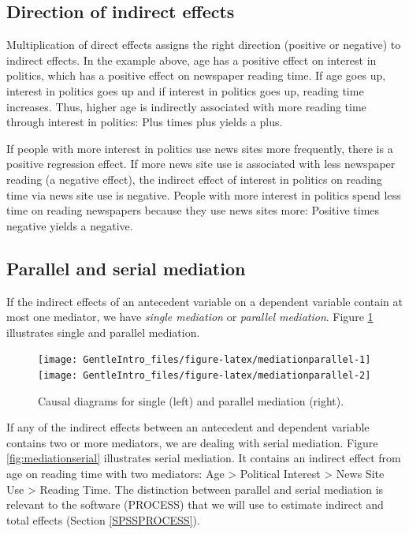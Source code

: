 \documentclass[a4paper]{book}
\theoremstyle{definition}
\theoremstyle{definition}
\theoremstyle{definition}
\theoremstyle{remark}
\begin{document}
\subsection{Direction of indirect
effects}\label{direction-of-indirect-effects}

Multiplication of direct effects assigns the right direction (positive
or negative) to indirect effects. In the example above, age has a
positive effect on interest in politics, which has a positive effect on
newspaper reading time. If age goes up, interest in politics goes up and
if interest in politics goes up, reading time increases. Thus, higher
age is indirectly associated with more reading time through interest in
politics: Plus times plus yields a plus.

If people with more interest in politics use news sites more frequently,
there is a positive regression effect. If more news site use is
associated with less newspaper reading (a negative effect), the indirect
effect of interest in politics on reading time via news site use is
negative. People with more interest in politics spend less time on
reading newspapers because they use news sites more: Positive times
negative yields a negative.

\subsection{Parallel and serial mediation}\label{partialserialmediation}

If the indirect effects of an antecedent variable on a dependent
variable contain at most one mediator, we have \emph{single mediation}
or \emph{parallel mediation}. Figure \ref{fig:mediationparallel}
illustrates single and parallel mediation.

\begin{figure}
\texttt{[image: GentleIntro\_files/figure-latex/mediationparallel-1]} \texttt{[image: GentleIntro\_files/figure-latex/mediationparallel-2]} \caption{Causal diagrams for single (left) and parallel mediation (right).}\label{fig:mediationparallel}
\end{figure}

If any of the indirect effects between an antecedent and dependent
variable contains two or more mediators, we are dealing with serial
mediation. Figure \ref{fig:mediationserial} illustrates serial
mediation. It contains an indirect effect from age on reading time with
two mediators: Age \textgreater{} Political Interest \textgreater{} News
Site Use \textgreater{} Reading Time. The distinction between parallel
and serial mediation is relevant to the software (PROCESS) that we will
use to estimate indirect and total effects (Section \ref{SPSSPROCESS}).
\end{document}
